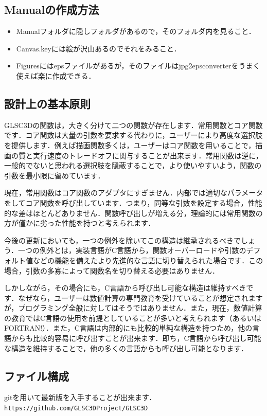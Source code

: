 \documentclass[platex,a4paper,12pt]{jsarticle}%
\begin{document}
\subsection{Manualの作成方法}
\begin{itemize}
 \item Manualフォルダに隠しフォルダがあるので，そのフォルダ内を見ること．
 \item Canvas.keyには絵が沢山あるのでそれをみること．
 \item Figuresにはepsファイルがあるが，そのファイルはjpg2epsconverterをうまく使えば楽に作成できる．
\end{itemize}

\subsection{設計上の基本原則}
GLSC3Dの関数は，大きく分けて二つの関数が存在します．常用関数とコア関数です．コア関数は大量の引数を要求する代わりに，ユーザーにより高度な選択肢を提供します．例えば描画関数多くは，ユーザーはコア関数を用いることで，描画の質と実行速度のトレードオフに関与することが出来ます．常用関数は逆に，一般的でないと思われる選択肢を隠蔽することで，より使いやすいよう，関数の引数を最小限に留めています．

現在，常用関数はコア関数のアダプタにすぎません．内部では適切なパラメータをしてコア関数を呼び出しています．つまり，同等な引数を設定する場合，性能的な差はほとんどありません．関数呼び出しが増える分，理論的には常用関数の方が僅かに劣った性能を持つと考えられます．

今後の更新においても，一つの例外を除いてこの構造は継承されるべきでしょう．一つの例外とは，実装言語がC言語から，関数オーバーロードや引数のデフォルト値などの機能を備えたより先進的な言語に切り替えられた場合です．この場合，引数の多寡によって関数名を切り替える必要はありません．

しかしながら，その場合にも，C言語から呼び出し可能な構造は維持すべきです．なぜなら，ユーザーは数値計算の専門教育を受けていることが想定されますが，プログラミング全般に対してはそうではありません．また，現在，数値計算の教育ではC言語の使用を前提としていることが多いと考えられます（あるいはFORTRAN!）．また，C言語は内部的にも比較的単純な構造を持つため，他の言語からも比較的容易に呼び出すことが出来ます．即ち，C言語から呼び出し可能な構造を維持することで，他の多くの言語からも呼び出し可能となります．


\subsection{ファイル構成}
gitを用いて最新版を入手することが出来ます．\verb|https://github.com/GLSC3DProject/GLSC3D|
\end{document}
